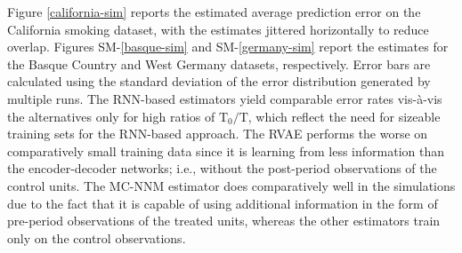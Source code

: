 Figure \ref{california-sim} reports the estimated average prediction error on the California smoking dataset, with the estimates jittered horizontally to reduce overlap. Figures SM-\ref{basque-sim} and SM-\ref{germany-sim} report the estimates for the Basque Country and West Germany datasets, respectively. Error bars are calculated using the standard deviation of the error distribution generated by multiple runs. The RNN-based estimators yield comparable error rates vis-à-vis the alternatives only for high ratios of $\text{T}_0/\text{T}$, which reflect the need for sizeable training sets for the RNN-based approach. The RVAE performs the worse on comparatively small training data since it is learning from less information than the encoder-decoder networks; i.e., without the post-period observations of the control units. The MC-NNM estimator does comparatively well in the simulations due to the fact that it is capable of using additional information in the form of pre-period observations of the treated units, whereas the other estimators train only on the control observations. 


